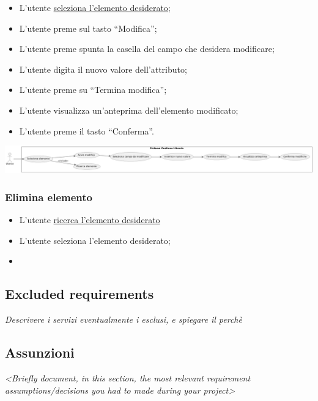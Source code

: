 \begin{itemize}
  \item
    L'utente \underline{seleziona l'elemento desiderato;}
  \item
    L'utente preme sul tasto ``Modifica'';
  \item
    L'utente preme spunta la casella del campo che desidera modificare;
  \item
    L'utente digita il nuovo valore dell'attributo;
  \item
    L'utente preme su ``Termina modifica'';
  \item
    L'utente visualizza un'anteprima dell'elemento modificato;
  \item
    L'utente preme il tasto ``Conferma''.
\end{itemize}

\begin{center}
  \includegraphics[width=\textwidth]{media/useCase4.png}
\end{center}

\subsubsection{Elimina elemento}\label{elimina-elemento}

\begin{itemize}
  \item
    L'utente \underline{ricerca l'elemento desiderato}
  \item
    L'utente seleziona l'elemento desiderato;
  \item
\end{itemize}

\subsection{Excluded requirements}

\emph{Descrivere i servizi eventualmente i esclusi, e spiegare il
perchè}

\subsection{Assunzioni}
\emph{\textless Briefly document, in this section, the most relevant
  requirement assumptions/decisions you had to made during your
project\textgreater{}}

